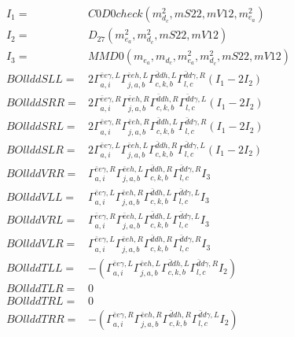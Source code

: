 \documentclass[A4,landscape]{article}
\begin{document}
\begin{align} 
I_1 = & C0D0check(m^2_{d_{{c}}}, mS22, mV12, m^2_{e_{{a}}}) \\ 
I_2 = & D_{27}(m^2_{e_{{a}}}, m^2_{d_{{c}}}, mS22, mV12) \\ 
I_3 = & MMD0(m_{e_{{a}}}, m_{d_{{c}}}, m^2_{e_{{a}}}, m^2_{d_{{c}}}, mS22, mV12) \\ 
  BOllddSLL= & 2  \Gamma^{\bar{e}e \gamma ,L}_{a, i} \Gamma^{\bar{e}e h ,L}_{j, a, b} \Gamma^{\bar{d}d h ,L}_{c, k, b} \Gamma^{\bar{d}d \gamma ,R}_{l, c} (I_1 - 2 I_2) \\ 
  BOllddSRR= & 2  \Gamma^{\bar{e}e \gamma ,R}_{a, i} \Gamma^{\bar{e}e h ,R}_{j, a, b} \Gamma^{\bar{d}d h ,R}_{c, k, b} \Gamma^{\bar{d}d \gamma ,L}_{l, c} (I_1 - 2 I_2) \\ 
  BOllddSRL= & 2  \Gamma^{\bar{e}e \gamma ,R}_{a, i} \Gamma^{\bar{e}e h ,R}_{j, a, b} \Gamma^{\bar{d}d h ,L}_{c, k, b} \Gamma^{\bar{d}d \gamma ,R}_{l, c} (I_1 - 2 I_2) \\ 
  BOllddSLR= & 2  \Gamma^{\bar{e}e \gamma ,L}_{a, i} \Gamma^{\bar{e}e h ,L}_{j, a, b} \Gamma^{\bar{d}d h ,R}_{c, k, b} \Gamma^{\bar{d}d \gamma ,L}_{l, c} (I_1 - 2 I_2) \\ 
  BOllddVRR= &  \Gamma^{\bar{e}e \gamma ,R}_{a, i} \Gamma^{\bar{e}e h ,L}_{j, a, b} \Gamma^{\bar{d}d h ,R}_{c, k, b} \Gamma^{\bar{d}d \gamma ,R}_{l, c} I_3 \\ 
  BOllddVLL= &  \Gamma^{\bar{e}e \gamma ,L}_{a, i} \Gamma^{\bar{e}e h ,R}_{j, a, b} \Gamma^{\bar{d}d h ,L}_{c, k, b} \Gamma^{\bar{d}d \gamma ,L}_{l, c} I_3 \\ 
  BOllddVRL= &  \Gamma^{\bar{e}e \gamma ,R}_{a, i} \Gamma^{\bar{e}e h ,L}_{j, a, b} \Gamma^{\bar{d}d h ,L}_{c, k, b} \Gamma^{\bar{d}d \gamma ,L}_{l, c} I_3 \\ 
  BOllddVLR= &  \Gamma^{\bar{e}e \gamma ,L}_{a, i} \Gamma^{\bar{e}e h ,R}_{j, a, b} \Gamma^{\bar{d}d h ,R}_{c, k, b} \Gamma^{\bar{d}d \gamma ,R}_{l, c} I_3 \\ 
  BOllddTLL= & -( \Gamma^{\bar{e}e \gamma ,L}_{a, i} \Gamma^{\bar{e}e h ,L}_{j, a, b} \Gamma^{\bar{d}d h ,L}_{c, k, b} \Gamma^{\bar{d}d \gamma ,R}_{l, c} I_2) \\ 
  BOllddTLR= & 0 \\ 
  BOllddTRL= & 0 \\ 
  BOllddTRR= & -( \Gamma^{\bar{e}e \gamma ,R}_{a, i} \Gamma^{\bar{e}e h ,R}_{j, a, b} \Gamma^{\bar{d}d h ,R}_{c, k, b} \Gamma^{\bar{d}d \gamma ,L}_{l, c} I_2) \\ 
\end{align} 
\end{document}
